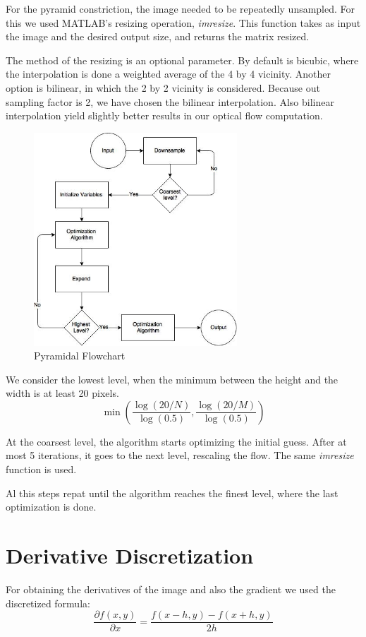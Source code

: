 \documentclass[12pt,a4paper,twoside]{report}
\begin{document}
{For the pyramid constriction, the image needed to be repeatedly unsampled. For this we used MATLAB's resizing operation,  \textit{imresize}. This function takes as input the image and the desired output size, and returns the matrix resized. 

The method of the resizing is an optional parameter. By default is bicubic, where the interpolation is done a weighted average of the 4 by 4 vicinity. Another option is bilinear, in which the 2 by 2 vicinity is considered. Because  out sampling factor is 2, we have chosen the bilinear interpolation. Also bilinear interpolation yield slightly better results in our optical flow computation.
\begin{figure}
	\label{CTFflow}
	\centering
	\includegraphics[width = 3in]{img/ctfflow} 
	\caption{Pyramidal Flowchart}
\end{figure}

We consider the lowest level, when the minimum between the height and the width is at least  20 pixels.  
$$
\min\left(\frac{\log(20/N)}{\log(0.5)},
\frac{\log(20/M)}{\log(0.5)}\right)
$$

At the coarsest level, the algorithm starts optimizing the initial guess. After at most 5 iterations, it goes to the next level, rescaling the flow. The same \textit{imresize} function is used. 

Al this steps repat until the algorithm reaches the finest level, where the last optimization is done.  

\section{Derivative Discretization}

 For obtaining the derivatives of the image and also the gradient we used the discretized formula:
\begin{equation}
		\frac{\partial f(x, y)}{\partial x} =  \frac{f(x-h, y) - f(x+h,y)}{2h}
\end{equation}

}
\end{document}

